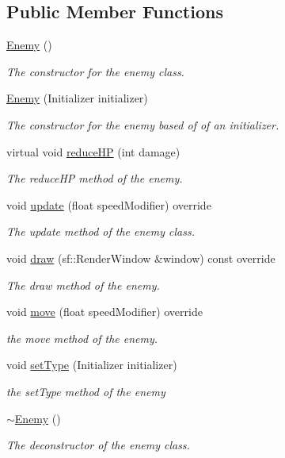\subsection*{Public Member Functions}
\begin{DoxyCompactItemize}
\item 
\hyperlink{class_enemy_a94f30d348b6d2840fd71675472ba38dd}{Enemy} ()
\begin{DoxyCompactList}\small\item\em The constructor for the enemy class. \end{DoxyCompactList}\item 
\hyperlink{class_enemy_a46078d479d4ca128752f2676fb2f5321}{Enemy} (Initializer initializer)
\begin{DoxyCompactList}\small\item\em The constructor for the enemy based of of an initializer. \end{DoxyCompactList}\item 
virtual void \hyperlink{class_enemy_a5545e77e51c4c03309a02eba5573ff73}{reduce\+H\+P} (int damage)
\begin{DoxyCompactList}\small\item\em The reduce\+H\+P method of the enemy. \end{DoxyCompactList}\item 
void \hyperlink{class_enemy_a5509b06f70a649c4ea9d1fb06f07cb5c}{update} (float speed\+Modifier) override
\begin{DoxyCompactList}\small\item\em The update method of the enemy class. \end{DoxyCompactList}\item 
void \hyperlink{class_enemy_ad35cb50c7b041a183f12756b939a4636}{draw} (sf\+::\+Render\+Window \&window) const override
\begin{DoxyCompactList}\small\item\em The draw method of the enemy. \end{DoxyCompactList}\item 
void \hyperlink{class_enemy_aa70fd228db393894a6cd941e067f1aad}{move} (float speed\+Modifier) override
\begin{DoxyCompactList}\small\item\em the move method of the enemy. \end{DoxyCompactList}\item 
void \hyperlink{class_enemy_ab33e544c241dffc381b7c3614f8c0438}{set\+Type} (Initializer initializer)
\begin{DoxyCompactList}\small\item\em the set\+Type method of the enemy \end{DoxyCompactList}\item 
\hyperlink{class_enemy_ac0eec4755e28c02688065f9657150ac3}{$\sim$\+Enemy} ()
\begin{DoxyCompactList}\small\item\em The deconstructor of the enemy class. \end{DoxyCompactList}\end{DoxyCompactItemize}
